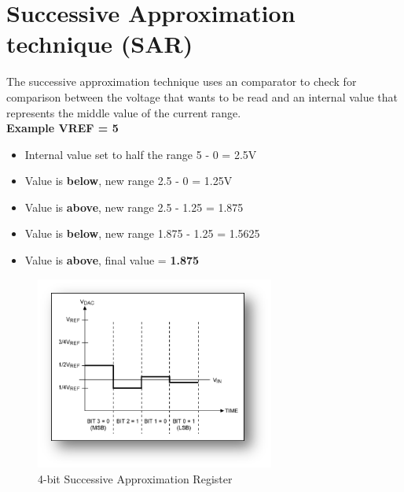 \section{Successive Approximation technique (SAR)}
The successive approximation technique uses an comparator to check for comparison between the voltage that wants to be read and an internal
value that represents the middle value of the current range.
\\ \textbf{Example VREF = 5}
\begin{itemize}
	\item Internal value set to half the range 5 - 0 = 2.5V
	\item Value is \textbf{below}, new range 2.5 - 0 = 1.25V
	\item Value is \textbf{above}, new range 2.5 - 1.25 = 1.875
	\item Value is \textbf{below}, new range 1.875 - 1.25 = 1.5625
	\item Value is \textbf{above}, final value = \textbf{1.875}
\end{itemize}
\begin{figure}[h!]		%
	\begin{centering}
 		\includegraphics[width=0.7\textwidth]{images/sar.png}
		\caption{4-bit Successive Approximation Register}
	\end{centering}
\end{figure}
\newpage
